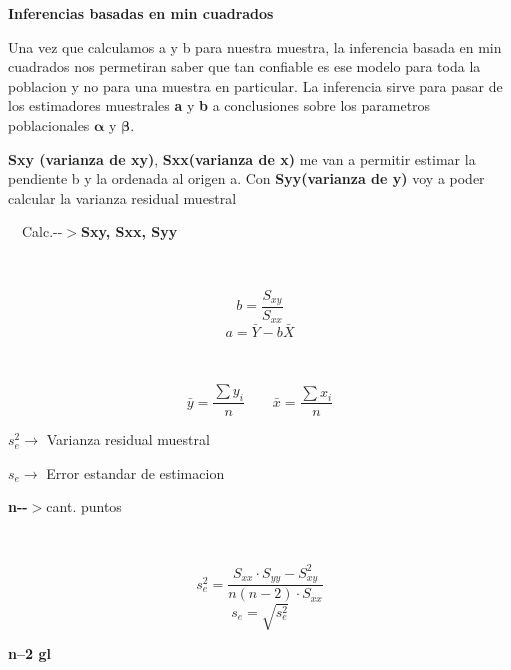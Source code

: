 \documentclass[12pt,a4paper]{article}
\newcommand{\paso}[1]{\tikz[baseline=(n.base)]{\node[draw, dashed, circle, inner sep=1.2pt, font=\footnotesize\bfseries] (n) {#1};}}
\begin{document}
\shorthandoff{<>}

{\fontsize{18}{22}\selectfont\bfseries Inferencias basadas en min cuadrados\par}

Una vez que calculamos a y b para nuestra muestra, la inferencia basada en min cuadrados nos permetiran saber que tan confiable es ese modelo para toda la poblacion y no para una muestra en particular. La inferencia sirve para pasar de los estimadores muestrales \textbf{a} y \textbf{b} a conclusiones sobre los parametros poblacionales $\boldsymbol{\alpha}$ y $\boldsymbol{\beta}$.

\textbf{Sxy (varianza de xy)}, \textbf{Sxx(varianza de x)} me van a permitir estimar la pendiente b y la ordenada al origen a. Con \textbf{Syy(varianza de y)} voy a poder calcular la varianza residual muestral

\begin{minipage}[t]{0.36\linewidth}
\vspace{0pt}
\paso{1} \ \ Calc.-{-}$>$\textbf{Sxy, Sxx, Syy}

\vspace{10pt}
\paso{3} \ \
\begin{minipage}[t]{0.72\linewidth}
\vspace{-16pt}
\[
b = \frac{S_{xy}}{S_{xx}}
\]
\[
a = \bar{Y} - b\bar{X}
\]
\end{minipage}
\end{minipage}\hfill
\begin{minipage}[t]{0.38\linewidth}
\vspace{0pt}
\paso{2} \ \
\begin{minipage}[t]{0.80\linewidth}
\vspace{-14pt}
\[
\bar{y} = \frac{\sum y_i}{n} \qquad \bar{x} = \frac{\sum x_i}{n}
\]
\end{minipage}
\end{minipage}\hfill
\begin{minipage}[t]{0.23\linewidth}
\vspace{0pt}
{\small
$s_e^2 \longrightarrow$ Varianza residual muestral

\vspace{6pt}
$s_e \longrightarrow$ Error estandar de estimacion

\vspace{6pt}
\textbf{n-{-}$>$}cant. puntos
}
\end{minipage}

\vspace{4pt}
\paso{4} \ \
\begin{minipage}[t]{0.42\linewidth}
\vspace{-16pt}
\[
s_e^2 = \frac{S_{xx}\cdot S_{yy} - S_{xy}^2}{n(n-2)\cdot S_{xx}}
\]
\[
s_e = \sqrt{s_e^2}
\]
\end{minipage}
\begin{minipage}[t]{0.30\linewidth}
\vspace{-4pt}
\textbf{n--2 gl}
\end{minipage}
\end{document}
